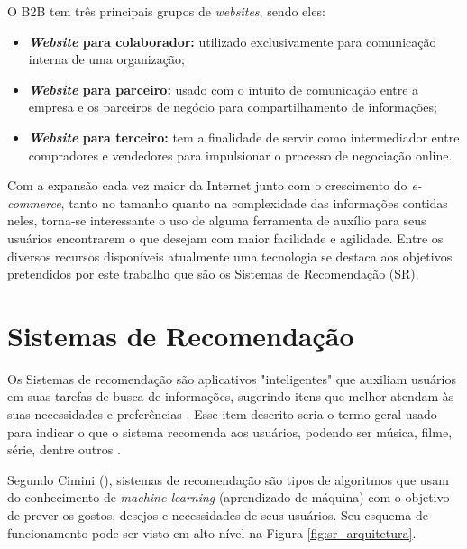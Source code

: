 O B2B tem três principais grupos de \textit{websites}, sendo eles:
\begin{itemize}
    \item \textbf{\textit{Website} para colaborador:} utilizado exclusivamente para comunicação interna de uma organização;
    
    \item \textbf{\textit{Website} para parceiro:} usado com o intuito de comunicação entre a empresa e os parceiros de negócio para compartilhamento de informações;
    
    \item \textbf{\textit{Website} para terceiro:} tem a finalidade de servir como intermediador entre compradores e vendedores para impulsionar o processo de negociação online.
    
\end{itemize}

Com a expansão cada vez maior da Internet junto com o crescimento do \textit{e-commerce}, tanto no tamanho quanto na complexidade das informações contidas neles, torna-se interessante o uso de alguma ferramenta de auxílio para seus usuários encontrarem o que desejam com maior facilidade e agilidade. Entre os diversos recursos disponíveis atualmente uma tecnologia se destaca aos objetivos pretendidos por este trabalho que são os Sistemas de Recomendação (SR).

\section{Sistemas de Recomendação}
\label{SR}

Os Sistemas de recomendação são aplicativos "inteligentes" que auxiliam usuários em suas tarefas de busca de informações, sugerindo itens que melhor atendam às suas necessidades e preferências \cite{Mahmood:2009:IRS:1557914.1557930}. Esse item descrito seria o termo geral usado para indicar o que o sistema recomenda aos usuários, podendo ser música, filme, série, dentre outros \cite{Ricci:2010}.

Segundo Cimini (\citeyear{Cimini:2019}), sistemas de recomendação são tipos de algoritmos que usam do conhecimento de \textit{machine learning} (aprendizado de máquina) com o objetivo de prever os gostos, desejos e necessidades de seus usuários. Seu esquema de funcionamento pode ser visto em alto nível na Figura \ref{fig:sr_arquitetura}.

